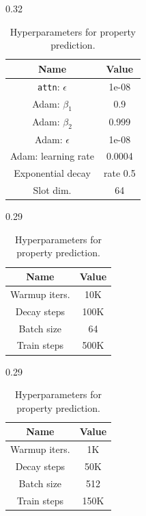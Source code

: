 \documentclass{article}
\begin{document}
\begin{table}
\centering
\caption{Other hyperparameters for all experiments.\label{table:all_hyperparams} }
 \begin{subtable}[t]{0.32\linewidth}
 \centering
 \small
 \caption{Shared hyperparameters. }
\label{table:other_hyp}
 \begin{tabular}{cc}
\toprule
Name & Value  \\
\midrule
\texttt{attn}: $\epsilon$ & 1e-08\\
Adam: $\beta_1$ & 0.9\\
Adam: $\beta_2$ & 0.999\\
Adam: $\epsilon$ & 1e-08\\
Adam: learning rate & 0.0004 \\
Exponential decay & rate 0.5\\
Slot dim. & 64\\
\bottomrule
\end{tabular}
\end{subtable}%
\hspace{5mm}
\begin{subtable}[t]{0.29\linewidth}
\centering
\small
\caption{Hyperparameters for object discovery.}\label{table:od_hyp}
\vspace{2mm}
\begin{tabular}{cc}
\toprule
Name & Value  \\
\midrule
Warmup iters. & 10K\\
Decay steps & 100K\\
Batch size & 64\\
Train steps & 500K\\
\bottomrule
\end{tabular}
\end{subtable}%
\hspace{5mm}
\begin{subtable}[t]{0.29\linewidth}
\centering
\small
\caption{Hyperparameters for property prediction.}\label{table:pp_hyp}
\vspace{2mm}
\begin{tabular}{cc}
\toprule
Name & Value  \\
\midrule
Warmup iters. & 1K\\
Decay steps & 50K\\
Batch size & 512\\
Train steps & 150K\\
\bottomrule
\end{tabular}
\end{subtable}
\end{table}
\end{document}
